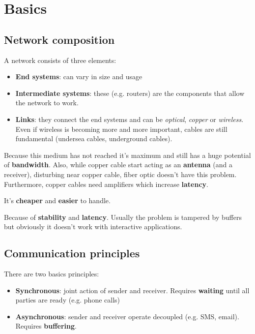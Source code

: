 \section{Basics}
\subsection{Network composition}
A network consists of three elements:
\begin{itemize}
	\item \textbf{End systems}: can vary in size and usage
	\item \textbf{Intermediate systems}: these (e.g. routers) are the components that allow the network to work.
	\item \textbf{Links}: they connect the end systems and can be \textit{optical}, \textit{copper} or \textit{wireless}. Even if wireless is becoming more and more important, cables are still fundamental (undersea cables, underground cables).
\end{itemize}

\begin{question}
	Because this medium has not reached it's maximum and still has a huge potential of \textbf{bandwidth}. Also, while copper cable start acting as an \textbf{antenna} (and a receiver), disturbing near copper cable, fiber optic doesn't have this problem. Furthermore, copper cables need amplifiers which increase \textbf{latency}.
\end{question}

\begin{question}
	It's \textbf{cheaper} and \textbf{easier} to handle.
\end{question}

\begin{question}
	Because of \textbf{stability} and \textbf{latency}. Usually the problem is tampered by buffers but obviously it doesn't work with interactive applications.
\end{question}

\begin{question}
	
\end{question}

\subsection{Communication principles}
There are two basics principles:
\begin{itemize}
	\item \textbf{Synchronous}: joint action of sender and receiver. Requires \textbf{waiting} until all parties are ready (e.g. phone calls)
	\item \textbf{Asynchronous}: sender and receiver operate decoupled (e.g. SMS, email). Requires \textbf{buffering}.
\end{itemize}

